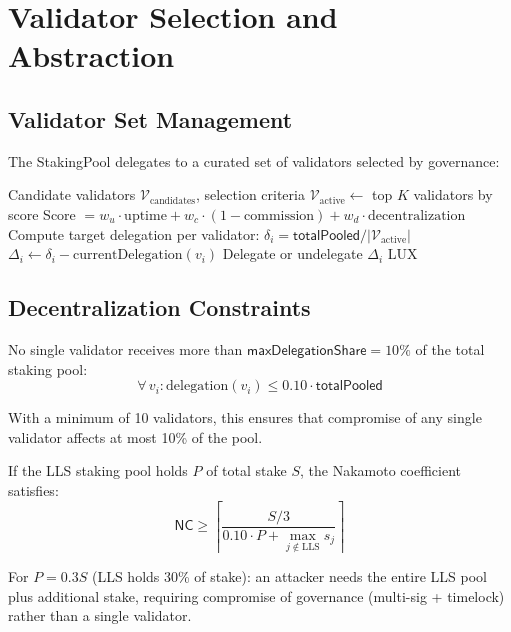 \section{Validator Selection and Abstraction}
\label{sec:validators}

\subsection{Validator Set Management}

The StakingPool delegates to a curated set of validators selected by governance:

\begin{algorithm}[H]
\caption{Validator Selection and Rebalancing}
\label{alg:validator}
\begin{algorithmic}[1]
\Require Candidate validators $\mathcal{V}_{\text{candidates}}$, selection criteria
\State $\mathcal{V}_{\text{active}} \gets$ top $K$ validators by score
\State Score $= w_u \cdot \text{uptime} + w_c \cdot (1 - \text{commission}) + w_d \cdot \text{decentralization}$
    \State Compute target delegation per validator: $\delta_i = \mathsf{totalPooled} / |\mathcal{V}_{\text{active}}|$
        \State $\Delta_i \gets \delta_i - \text{currentDelegation}(v_i)$
            \State Delegate or undelegate $\Delta_i$ LUX
        \EndIf
    \EndFor
\EndFor
\end{algorithmic}
\end{algorithm}

\subsection{Decentralization Constraints}

\begin{definition}
No single validator receives more than $\mathsf{maxDelegationShare} = 10\%$ of the total staking pool:
\begin{equation}
    \forall\, v_i : \text{delegation}(v_i) \leq 0.10 \cdot \mathsf{totalPooled}
\end{equation}
\end{definition}

With a minimum of 10 validators, this ensures that compromise of any single validator affects at most 10\% of the pool.

\begin{proposition}
If the LLS staking pool holds $P$ of total stake $S$, the Nakamoto coefficient satisfies:
\begin{equation}
    \mathsf{NC} \geq \left\lceil \frac{S/3}{0.10 \cdot P + \max_{j \notin \text{LLS}} s_j} \right\rceil
\end{equation}
\end{proposition}

For $P = 0.3S$ (LLS holds 30\% of stake): an attacker needs the entire LLS pool plus additional stake, requiring compromise of governance (multi-sig + timelock) rather than a single validator.

